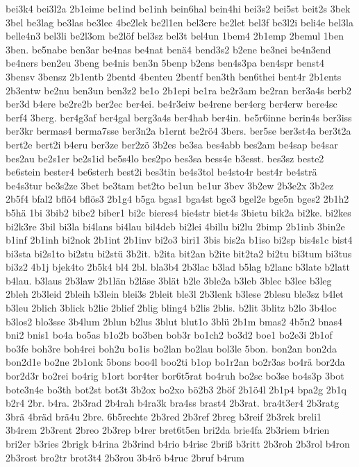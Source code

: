 {bei3k4
bei3l2a
2b1eime
be1ind
be1inh
bein6hal
bein4hi
bei3s2
bei5st
beit2s
3bek
3bel
be3lag
be3las
be3lec
4be2lek
be2l1en
bel3ere
be2let
bel3f
be3l2i
beli4e
bel3la
belle4n3
bel3li
be2l3om
be2löf
bel3sz
bel3t
bel4un
1bem4
2b1emp
2bemul
1ben
3ben.
be5nabe
ben3ar
be4nas
be4nat
benä4
bend3s2
b2ene
be3nei
be4n3end
be4ners
ben2eu
3beng
be4nis
ben3n
5benp
b2ens
ben4s3pa
ben4spr
benst4
3bensv
3bensz
2b1entb
2bentd
4benteu
2bentf
ben3th
ben6thei
bent4r
2b1ents
2b3entw
be2nu
ben3un
ben3z2
be1o
2b1epi
be1ra
be2r3am
be2ran
ber3a4s
berb2
ber3d
b4ere
be2re2b
ber2ec
ber4ei.
be4r3eiw
be4rene
ber4erg
ber4erw
bere4sc
berf4
3berg.
ber4g3af
ber4gal
berg3a4s
ber4hab
ber4in.
be5r6inne
berin4s
ber3iss
ber3kr
bermas4
berma7sse
ber3n2a
b1ernt
be2rö4
3bers.
ber5se
ber3st4a
ber3t2a
bert2e
bert2i
b4eru
ber3ze
ber2zö
3b2es
be3sa
bes4abb
bes2am
be4sap
be4sar
bes2au
be2s1er
be2s1id
be5s4lo
bes2po
bes3sa
bess4e
b3esst.
bes3sz
beste2
be6stein
bester4
be6sterh
best2i
bes3tin
be4s3tol
be4sto4r
best4r
be4strä
be4s3tur
be3s2ze
3bet
be3tam
bet2to
be1un
be1ur
3bev
3b2ew
2b3e2x
3b2ez
2b5f4
bfal2
bflö4
bflös3
2b1g4
b5ga
bgas1
bga4st
bge3
bgel2e
bge5n
bges2
2b1h2
b5hä
1bi
3bib2
bibe2
biber1
bi2c
bieres4
bie4str
biet4s
3bietu
bik2a
bi2ke.
bi2kes
bi2k3re
3bil
bi3la
bi4lans
bi4lau
bil4deb
bi2lei
4billu
bi2lu
2bimp
2b1inb
3bin2e
b1inf
2b1inh
bi2nok
2b1int
2b1inv
bi2o3
biri1
3bis
bis2a
b1iso
bi2sp
bis4s1c
bist4
bi3sta
bi2s1to
bi2stu
bi2stü
3b2it.
b2ita
bit2an
b2ite
bit2ta2
bi2tu
bi3tum
bi3tus
bi3z2
4b1j
bjek4to
2b5k4
bl4
2bl.
bla3b4
2b3lac
b3lad
b5lag
b2lanc
b3late
b2latt
b4lau.
b3laus
2b3law
2b1län
b2läse
3blät
b2le
3ble2a
b3leb
3blec
b3lee
b3leg
2bleh
2b3leid
2bleih
b3lein
blei3s
2bleit
ble3l
2b3lenk
b3lese
2blesu
ble3sz
b4let
b3leu
2blich
3blick
b2lie
2blief
2blig
bling4
b2lis
2blis.
b2lit
3blitz
b2lo
3b4loc
b3los2
blo3sse
3b4lum
2blun
b2lus
3blut
blut1o
3blü
2b1m
bmas2
4b5n2
bnas4
bni2
bnis1
bo4a
bo5as
b1o2b
bo3ben
bob3r
bo1ch2
bo3d2
boe1
bo2e3i
2b1of
bo3fe
boh3re
boh4rei
boh2u
bo1is
bo2lan
bo2lau
bol3le
5bon.
bon2an
bon2da
bon2d1e
bo2ne
2b1onk
5bons
boo4l
boo2ti
b1op
bo1r2an
bo2r3as
bo4rä
bor2da
bor2d3r
bo2rei
bo4rig
b1ort
bor4ter
bor6t5rat
bo4ruh
bo2sc
bo3se
bo4s3p
3bot
bote3n4e
bo3th
bot2st
bot3t
3b2ox
bo2xo
bö2b3
2böf
2b1ö4l
2b1p4
bpa2g
2b1q
b2r4
2br.
b4ra.
2b3rad
2b4rah
b4ra3k
bra4ss
brast4
2b3rat.
bra4t3er4
2b3ratg
3brä
4bräd
brä4u
2bre.
6b5rechte
2b3red
2b3ref
2breg
b3reif
2b3rek
breli1
3b4rem
2b3rent
2breo
2b3rep
b4rer
bret6t5en
bri2da
brie4fa
2b3riem
b4rien
bri2er
b3ries
2brigk
b4rina
2b3rind
b4rio
b4risc
2briß
b3ritt
2b3roh
2b3rol
b4ron
2b3rost
bro2tr
brot3t4
2b3rou
3b4rö
b4ruc
2bruf
b4rum
}

